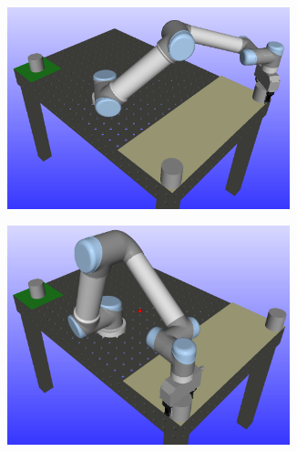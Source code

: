 \documentclass[../main.tex]{subfiles}
\begin{document}
\begin{figure}[H]
    \centering
    \begin{subfigure}{0.329\textwidth}
        \centering
        \includegraphics[width=0.9\textwidth]{figures/workcell_setup/final_robot_position1.png}
    \end{subfigure}%
    \begin{subfigure}{0.329\textwidth}
        \centering
        \includegraphics[width=0.9\textwidth]{figures/workcell_setup/final_robot_position2.png}
    \end{subfigure}%
    \begin{subfigure}{0.329\textwidth}
        \centering

\end{subfigure}
\end{figure}
\end{document}
